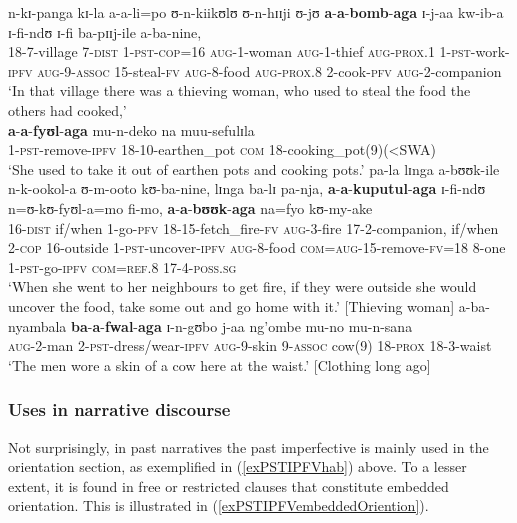 \begin{exe}
\ex \label{exPSTIPFVhab}
\gll n-kɪ-panga kɪ-la a-a-li=po ʊ-n-kiikʊlʊ ʊ-n-hɪɪji ʊ-jʊ \textbf{a}-\textbf{a}-\textbf{bomb}-\textbf{aga} ɪ-j-aa kw-ib-a ɪ-fi-ndʊ ɪ-fi ba-pɪɪj-ile a-ba-nine,\\
18-7-village 7-\textsc{dist} 1-\textsc{pst}-\textsc{cop}=16 \textsc{aug}-1-woman \textsc{aug}-1-thief \textsc{aug}-\textsc{prox.1} 1-\textsc{pst}-work-\textsc{ipfv} \textsc{aug}-9-\textsc{assoc} 15-steal-\textsc{fv} \textsc{aug}-8-food \textsc{aug}-\textsc{prox.8} 2-cook-\textsc{pfv} \textsc{aug}-2-companion\\
\glt `In that village there was a thieving woman, who used to steal the food the others had cooked,'\\
\sn  \gll \textbf{a}-\textbf{a}-\textbf{fyʊl}-\textbf{aga} mu-n-deko na muu-sefulɪla\\
1-\textsc{pst}-remove-\textsc{ipfv} 18-10-earthen\_pot \textsc{com} 18-cooking\_pot(9)(<SWA)\\
\glt \lq She used to take it out of earthen pots and cooking pots.'
\sn \gll pa-la lɪnga a-bʊʊk-ile n-k-ookol-a ʊ-m-ooto kʊ-ba-nine, lɪnga ba-lɪ pa-nja, \textbf{a}-\textbf{a}-\textbf{kuputul}-\textbf{aga} ɪ-fi-ndʊ n=ʊ-kʊ-fyʊl-a=mo fi-mo, \textbf{a}-\textbf{a}-\textbf{bʊʊk}-\textbf{aga} na=fyo kʊ-my-ake\\
16-\textsc{dist} if/when 1-go-\textsc{pfv} 18-15-fetch\_fire-\textsc{fv} \textsc{aug}-3-fire 17-2-companion, if/when 2-\textsc{cop} 16-outside 1-\textsc{pst}-uncover-\textsc{ipfv} \textsc{aug}-8-food \textsc{com}=\textsc{aug}-15-remove-\textsc{fv}=18 8-one 1-\textsc{pst}-go-\textsc{ipfv} \textsc{com}=\textsc{ref.8} 17-4-\textsc{poss.sg}\\
\glt \lq When she went to her neighbours to get fire, if they were outside she would uncover the food, take some out and go home with it.' [Thieving woman]
\ex \gll a-ba-nyambala \textbf{ba}-\textbf{a}-\textbf{fwal}-\textbf{aga} ɪ-n-gʊbo j-aa ng'ombe mu-no mu-n-sana\\
\textsc{aug}-2-man 2-\textsc{pst}-dress/wear-\textsc{ipfv} \textsc{aug}-9-skin 9-\textsc{assoc} cow(9) 18-\textsc{prox} 18-3-waist\\
\glt \lq The men wore a skin of a cow here at the waist.' [Clothing long ago]\label{exPSTIPFVgen}
\end{exe}

\subsubsection{Uses in narrative discourse}
Not surprisingly, in past narratives the past imperfective is mainly used in the orientation section, as exemplified in (\ref{exPSTIPFVhab}) above. To a lesser extent, it is found in free or restricted clauses that constitute embedded orientation. This is illustrated in (\ref{exPSTIPFVembeddedOriention}). %

